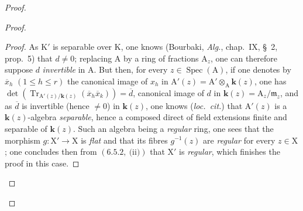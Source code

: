 \begin{proof}
\begin{proof}
\begin{proof}
As $\mathrm{K}'$ is separable over $\mathrm{K}$, one knows (Bourbaki, \emph{Alg.}, chap.~IX, \S~2, prop.~5)
that $d\neq 0$; replacing $\mathrm{A}$ by a ring of fractions $\mathrm{A}_z$, one can therefore suppose $d$
\emph{invertible} in $\mathrm{A}$. But then, for every $z\in\operatorname{Spec}(\mathrm{A})$, if one denotes by $\overline{x}_h$ $(1\leqslant h\leqslant r)$
the canonical image of $x_h$ in $\mathrm{A}'(z)=\mathrm{A}'\otimes_\mathrm{A}\boldsymbol{k}(z)$, one has $\det(\operatorname{Tr}_{\mathrm{A}'(z)/\boldsymbol{k}(z)}(\overline{x}_h\overline{x}_k))=\overline{d}$, canonical
image of $d$ in $\boldsymbol{k}(z)=\mathrm{A}_z/\mathfrak{m}_z$, and as $\overline{d}$ is invertible (hence $\neq 0$) in $\boldsymbol{k}(z)$, one
knows (\emph{loc.~cit.}) that $\mathrm{A}'(z)$ is a $\boldsymbol{k}(z)$-algebra \emph{separable}, hence a composed direct of field
extensions finite and separable of $\boldsymbol{k}(z)$. Such an algebra being a \emph{regular} ring, one sees
that the morphism $g:\mathrm{X}'\to\mathrm{X}$ is \emph{flat} and that its fibres $g^{-1}(z)$ are \emph{regular} for every
$z\in\mathrm{X}$; one concludes then from $(6.5.2,~\text{(ii)})$ that $\mathrm{X}'$ is \emph{regular}, which finishes the proof in this case.
\end{proof}


\end{proof}
\end{proof}
